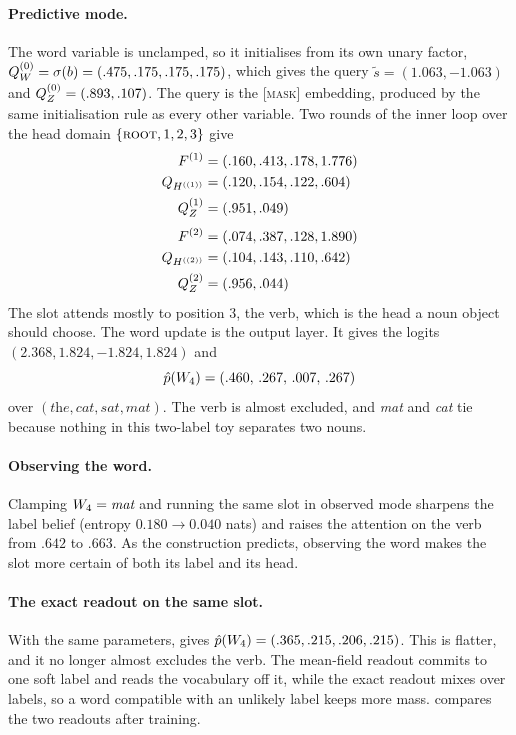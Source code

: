 \paragraph{Predictive mode.}
The word variable is unclamped, so it initialises from its own unary factor,
$Q_{W_{}}^{(0)} = \sigma(b) = (.475,.175,.175,.175)$, which gives the query
$\tilde{s} = (1.063,-1.063)$ and $Q_{Z_{}}^{(0)} = (.893,.107)$. The query is the
\textsc{[mask]} embedding, produced by the same initialisation rule as every other variable. Two
rounds of the inner loop over the head domain $\{\textsc{root}, 1, 2, 3\}$ give
%
\begin{align*}
  F^{(1)} &= (.160,.413,.178,1.776) \\
  Q_{H_{}^{((1))}} &= (.120,.154,.122,.604) \\
  Q_{Z_{}}^{(1)} &= (.951,.049) \\[3pt]
  F^{(2)} &= (.074,.387,.128,1.890) \\
  Q_{H_{}^{((2))}} &= (.104,.143,.110,.642) \\
  Q_{Z_{}}^{(2)} &= (.956,.044)
\end{align*}
%
The slot attends mostly to position 3, the verb, which is the head a noun object should choose.
The word update is the output layer. It gives the logits $(2.368, 1.824, -1.824, 1.824)$ and
%
\[
  \hat{p}(W_{4}) = (.460,\, .267,\, .007,\, .267)
\]
%
over $(\textit{the},\textit{cat},\textit{sat},\textit{mat})$. The verb is almost excluded, and
\textit{mat} and \textit{cat} tie because nothing in this two-label toy separates two nouns.

\paragraph{Observing the word.}
Clamping $W_{4} = \textit{mat}$ and running the same slot in observed mode sharpens the
label belief (entropy $0.180 \to 0.040$ nats) and raises the attention on the verb from $.642$
to $.663$. As the construction predicts, observing the word makes the slot more certain of both
its label and its head.

\paragraph{The exact readout on the same slot.}
With the same parameters,  gives
$\hat{p}(W_{4}) = (.365,.215,.206,.215)$. This is flatter, and it no longer almost excludes the
verb. The mean-field readout commits to one soft label and reads the vocabulary off it, while
the exact readout mixes over labels, so a word compatible with an unlikely label keeps more mass.
 compares the two readouts after training.

